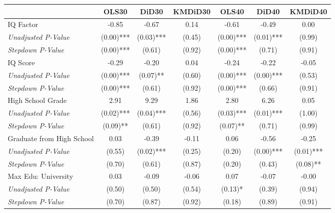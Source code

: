 \begin{tabular}{l c c c c c c}
\toprule
 & OLS30 & DiD30 & KMDiD30 & OLS40 & DiD40 & KMDiD40 \\
\midrule
IQ Factor & -0.85 & -0.67 & 0.14 & -0.61 & -0.49 & 0.00 \\
\quad \textit{Unadjusted P-Value} & (0.00)*** & (0.03)*** & (0.45) & (0.00)*** & (0.01)*** & (0.99) \\
\quad \textit{Stepdown P-Value} & (0.00)*** & (0.61) & (0.92) & (0.00)*** & (0.71) & (0.91) \\
IQ Score & -0.29 & -0.20 & 0.04 & -0.24 & -0.22 & -0.05 \\
\quad \textit{Unadjusted P-Value} & (0.00)*** & (0.07)** & (0.60) & (0.00)*** & (0.00)*** & (0.53) \\
\quad \textit{Stepdown P-Value} & (0.00)*** & (0.61) & (0.92) & (0.00)*** & (0.66) & (0.91) \\
High School Grade & 2.91 & 9.29 & 1.86 & 2.80 & 6.26 & 0.05 \\
\quad \textit{Unadjusted P-Value} & (0.02)*** & (0.04)*** & (0.56) & (0.03)*** & (0.01)*** & (1.00) \\
\quad \textit{Stepdown P-Value} & (0.09)** & (0.61) & (0.92) & (0.07)** & (0.71) & (0.99) \\
Graduate from High School & 0.03 & -0.39 & -0.11 & 0.06 & -0.56 & -0.25 \\
\quad \textit{Unadjusted P-Value} & (0.55) & (0.02)*** & (0.25) & (0.20) & (0.00)*** & (0.01)*** \\
\quad \textit{Stepdown P-Value} & (0.70) & (0.61) & (0.87) & (0.20) & (0.43) & (0.08)** \\
Max Edu: University & 0.03 & -0.09 & -0.06 & 0.07 & -0.07 & -0.00 \\
\quad \textit{Unadjusted P-Value} & (0.50) & (0.50) & (0.54) & (0.13)* & (0.39) & (0.94) \\
\quad \textit{Stepdown P-Value} & (0.70) & (0.87) & (0.92) & (0.18) & (0.89) & (0.91) \\
\bottomrule
\end{tabular}
